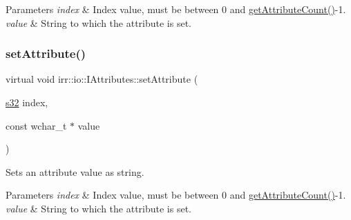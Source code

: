\begin{DoxyParams}{Parameters}
{\em index} & Index value, must be between 0 and \hyperlink{classirr_1_1io_1_1IAttributes_a796bdd9440ee7ba0b6742a90a82870b6}{get\+Attribute\+Count()}-\/1. \\
\hline
{\em value} & String to which the attribute is set. \\
\hline
\end{DoxyParams}
\mbox{\label{classirr_1_1io_1_1IAttributes_a679ae0badc391b6814db9cd7cf3d45bc}} 
\subsubsection{\texorpdfstring{set\+Attribute()}{setAttribute()}\hspace{0.1cm}{\footnotesize\ttfamily [8/10]}}
{\footnotesize\ttfamily virtual void irr\+::io\+::\+I\+Attributes\+::set\+Attribute (\begin{DoxyParamCaption}\item[{\hyperlink{namespaceirr_ac66849b7a6ed16e30ebede579f9b47c6}{s32}}]{index,  }\item[{const wchar\+\_\+t $\ast$}]{value }\end{DoxyParamCaption})\hspace{0.3cm}{\ttfamily [pure virtual]}}



Sets an attribute value as string. 


\begin{DoxyParams}{Parameters}
{\em index} & Index value, must be between 0 and \hyperlink{classirr_1_1io_1_1IAttributes_a796bdd9440ee7ba0b6742a90a82870b6}{get\+Attribute\+Count()}-\/1. \\
\hline
{\em value} & String to which the attribute is set. \\
\hline
\end{DoxyParams}
\mbox{\label{classirr_1_1io_1_1IAttributes_a95abee2c34c3a438ba0df22d339b806e}} 
